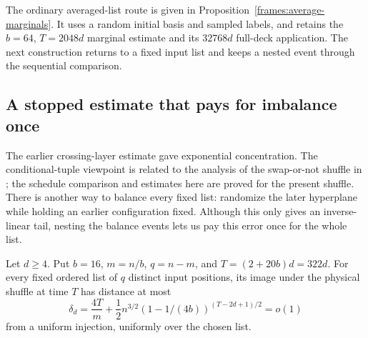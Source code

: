 The ordinary averaged-list route is given in
Proposition~\ref{frames:average-marginals}. It uses a random initial
basis and sampled labels, and retains the $b=64$, $T=2048d$ marginal
estimate and its $32768d$ full-deck application. The next construction
returns to a fixed input list and keeps a nested event through the
sequential comparison.

\subsection{A stopped estimate that pays for imbalance once}
\label{frames:stopped-section}

The earlier crossing-layer estimate gave exponential concentration.
The conditional-tuple viewpoint is related to the analysis of the
swap-or-not shuffle in \cite[Section~3]{hmr2014}; the schedule comparison
and estimates here are proved for the present shuffle.
There is another way to balance every fixed list: randomize the later
hyperplane while holding an earlier configuration fixed. Although this
only gives an inverse-linear tail, nesting the balance events lets us
pay this error once for the whole list.

\begin{proposition}
\label{frames:stopped-marginals}
Let $d\ge4$. Put $b=16$, $m=n/b$, $q=n-m$, and
$T=(2+20b)d=322d$.
For every fixed ordered list of $q$ distinct input positions, its image
under the physical shuffle at time $T$ has distance at most
\begin{equation}
 \delta_d=\frac{4T}{m}+\frac12n^{3/2}
                (1-1/(4b))^{(T-2d+1)/2}=o(1)
 \label{frames:stopped-delta}
\end{equation}
from a uniform injection, uniformly over the chosen list.
\end{proposition}


